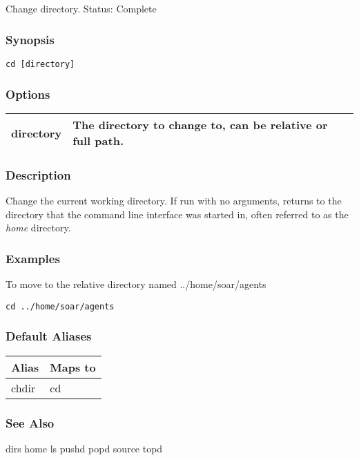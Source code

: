 \subsection{}
\label{cd}
Change directory. 
 Status: Complete
\subsubsection*{Synopsis}
\begin{verbatim}
cd [directory]
\end{verbatim}
\subsubsection*{Options}
\begin{tabular}{|l|l|}
\hline 
 directory  & The directory to change to, can be relative or full path.  \\
 \hline 
\end{tabular}
\subsubsection*{Description}
 Change the current working directory. If run with no arguments, returns to the directory that the command line interface was started in, often referred to as the \emph{home}
 directory. 
\subsubsection*{Examples}
 To move to the relative directory named ../home/soar/agents \begin{verbatim}
cd ../home/soar/agents
\end{verbatim}
\subsubsection*{Default Aliases}
\begin{tabular}{|l|l|}
\hline 
 Alias  & Maps to  \\
 \hline 
 chdir  & cd  \\
 \hline 
\end{tabular}
\subsubsection*{See Also}
 dirs home ls pushd popd source topd
